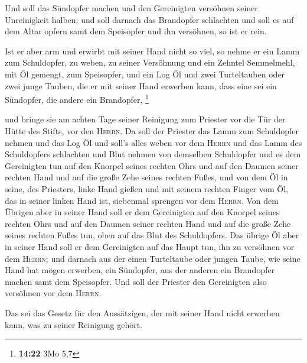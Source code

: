  Und soll das Sündopfer machen und den Gereinigten
versöhnen seiner Unreinigkeit halben; und soll darnach das Brandopfer
schlachten  und soll es auf dem Altar opfern samt dem
Speisopfer und ihn versöhnen, so ist er rein.

 Ist er aber arm und erwirbt mit seiner Hand nicht so
viel, so nehme er ein Lamm zum Schuldopfer, zu weben, zu seiner
Versöhnung und ein Zehntel Semmelmehl, mit Öl gemengt, zum Speisopfer,
und ein Log Öl  und zwei Turteltauben oder zwei junge
Tauben, die er mit seiner Hand erwerben kann, dass eine sei ein
Sündopfer, die andere ein Brandopfer, \footnote{\textbf{14:22} 3Mo 5,7}

 und bringe sie am achten Tage seiner Reinigung zum
Priester vor die Tür der Hütte des Stifts, vor den \textsc{Herrn}.
 Da soll der Priester das Lamm zum Schuldopfer nehmen und
das Log Öl und soll's alles weben vor dem \textsc{Herrn} 
und das Lamm des Schuldopfers schlachten und Blut nehmen von demselben
Schuldopfer und es dem Gereinigten tun auf den Knorpel seines rechten
Ohrs und auf den Daumen seiner rechten Hand und auf die große Zehe
seines rechten Fußes,  und von dem Öl in seine, des
Priesters, linke Hand gießen  und mit seinem rechten
Finger vom Öl, das in seiner linken Hand ist, siebenmal sprengen vor dem
\textsc{Herrn}.  Von dem Übrigen aber in seiner Hand soll
er dem Gereinigten auf den Knorpel seines rechten Ohrs und auf den
Daumen seiner rechten Hand und auf die große Zehe seines rechten Fußes
tun, oben auf das Blut des Schuldopfers.  Das übrige Öl
aber in seiner Hand soll er dem Gereinigten auf das Haupt tun, ihn zu
versöhnen vor dem \textsc{Herrn};  und darnach aus der
einen Turteltaube oder jungen Taube, wie seine Hand hat mögen erwerben,
 ein Sündopfer, aus der anderen ein Brandopfer machen
samt dem Speisopfer. Und soll der Priester den Gereinigten also
versöhnen vor dem \textsc{Herrn}.

 Das sei das Gesetz für den Aussätzigen, der mit seiner
Hand nicht erwerben kann, was zu seiner Reinigung gehört.

